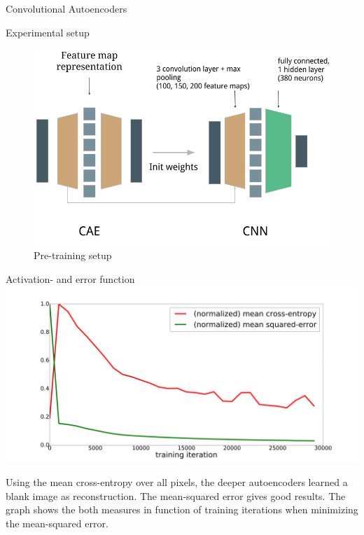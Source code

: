 \documentclass[final]{beamer}
\newlength{\onecolwid}
\begin{document}
\begin{frame}[t]
\begin{columns}[t]
\begin{column}{\onecolwid}
\begin{block}{Convolutional Autoencoders}
\end{block}


\begin{block}{Experimental setup}

\begin{figure}
\includegraphics[width=\linewidth]{graphics/setup.png}
\caption{Pre-training setup}
\end{figure}

\end{block}


\begin{block}{Activation- and error function}
	\centering
	\includegraphics[width=.7\linewidth]{graphics/mse_ce_comparison.png}

	Using the mean cross-entropy over all pixels, the deeper autoencoders learned a blank image as reconstruction. The mean-squared error gives good results. The graph shows the both measures in function of training iterations when minimizing the mean-squared error. 

\end{block}


\end{column}
\end{columns}
\end{frame}
\end{document}
